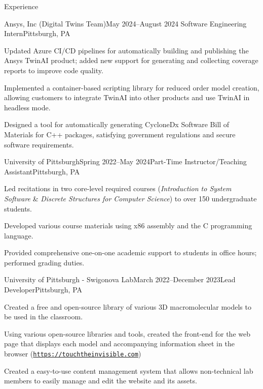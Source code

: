 \begin{rSection}{Experience}
    \begin{rSubsection}{Ansys, Inc (Digital Twins Team)}{May 2024–August 2024}
    {Software Engineering Intern}{Pittsburgh, PA}
        \item Updated Azure CI/CD pipelines for automatically building and publishing the Ansys TwinAI product; added new support for generating and collecting coverage reports to improve code quality.
         \item Implemented a container-based scripting library for reduced order model creation, allowing customers to integrate TwinAI into other products and use TwinAI in headless mode.
        \item Designed a tool for automatically generating CycloneDx Software Bill of Materials for C++ packages, satisfying government regulations and secure software requirements.
    \end{rSubsection}
  
    \begin{rSubsection}{University of Pittsburgh}{Spring 2022–May 2024}{Part-Time Instructor/Teaching Assistant}{Pittsburgh, PA}
        \item Led recitations in two core-level required courses (\textit{Introduction to System Software} \& \textit{Discrete Structures for Computer Science}) to over 150 undergraduate students.
        \item Developed various course materials using x86 assembly and the C programming language.
        \item Provided comprehensive one-on-one academic support to students in office hours; performed grading duties.
    \end{rSubsection}

    \begin{rSubsection}{University of Pittsburgh - Swigonova Lab}{March 2022–December 2023}{Lead Developer}{Pittsburgh, PA}
        \item Created a free and open-source library of various 3D macromolecular models to be used in the classroom.
        \item Using various open-source libraries and tools, created the front-end for the web page that displays each model and accompanying information sheet in the browser (\href{https://touchtheinvisible.com}{\nolinkurl{https://touchtheinvisible.com}})
        \item Created a easy-to-use content management system that allows non-technical lab members to easily manage and edit the website and its assets.
    \end{rSubsection}
    
  
  \end{rSection}